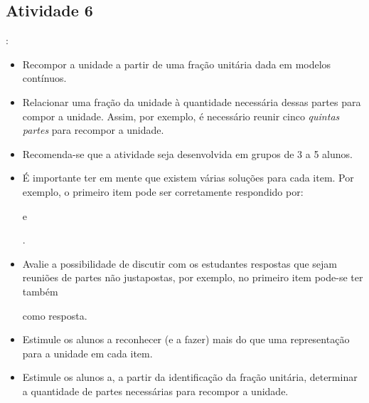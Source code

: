 \pagebreak

\subsection{Atividade 6}
  \vspace{.1cm}:
\begin{itemize} %
    \item       Recompor a unidade a partir de uma fração unitária dada em modelos contínuos.
    \item       Relacionar uma fração da unidade à quantidade necessária dessas partes para compor a unidade. Assim, por exemplo, é necessário reunir cinco       {\it quintas partes}       para recompor a unidade.
\end{itemize} %


 \vspace{.1cm}

   \vspace{.1cm}

  \begin{itemize} %
    \item Recomenda-se que a atividade seja desenvolvida em grupos de 3 a 5 alunos.
    \item É importante ter em mente que existem várias soluções para cada item. Por exemplo, o primeiro item pode ser corretamente respondido por:             
 e
 .
    \item       Avalie a possibilidade de discutir com os estudantes respostas que sejam reuniões de partes não justapostas, por exemplo, no primeiro item pode-se ter também             
      como resposta.
    \item Estimule os alunos a reconhecer (e a fazer) mais do que uma representação para a unidade em cada item.
    \item Estimule os alunos a, a partir da identificação da fração unitária, determinar a quantidade de partes necessárias para recompor a unidade.
\end{itemize} %

